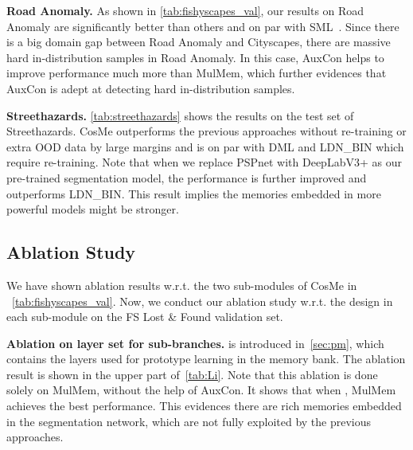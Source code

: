 \documentclass[10pt,twocolumn,letterpaper]{article}
\begin{document}
\noindent\textbf{Road Anomaly.}
\label{sec:RoadAnomaly}
As shown in \cref{tab:fishyscapes_val}, our results on Road Anomaly are significantly better than others and on par with SML~\cite{SML}. Since there is a big domain gap between Road Anomaly and Cityscapes, there are massive hard in-distribution samples in Road Anomaly. In this case,  AuxCon helps to improve performance much more than MulMem, which further evidences that AuxCon is adept at detecting hard in-distribution samples.

\noindent\textbf{Streethazards.}
\cref{tab:streethazards} shows the results on the test set of Streethazards. CosMe outperforms the previous approaches without re-training or extra OOD data by large margins and is on par with DML and LDN\_BIN which require re-training. Note that when we replace PSPnet with DeepLabV3+ as our pre-trained segmentation model, the performance is further improved and outperforms LDN\_BIN. This result implies the memories embedded in more powerful models might be stronger.

\subsection{Ablation Study}
We have shown ablation results w.r.t. the two sub-modules of CosMe in ~\cref{tab:fishyscapes_val}. Now, we conduct our ablation study w.r.t. the design in each sub-module on the FS Lost \& Found validation set.



\noindent \textbf{Ablation on layer set  for sub-branches.}  is introduced in~\cref{sec:pm}, which contains the layers used for prototype learning in the  memory bank. The ablation result is shown in the upper part of~\cref{tab:Li}. Note that this ablation is done solely on MulMem, without the help of AuxCon. It shows that when , MulMem achieves the best performance. This evidences there are rich memories embedded in the segmentation network, which are not fully exploited by the previous approaches.
\end{document}
